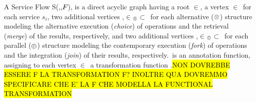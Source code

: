 \begin{definition} \label{def:service_flow}
  A Service Flow S(\V,\E,$F_{}$), is a direct acyclic graph having a root $\in$\V, a vertex $\in$\V\ for each service $s_i$,
  two additional vertices ,$\in$\V$_{\otimes}$$\subset$\V\ for each alternative ($\otimes$) structure modeling the alternative execution (\emph{choice}) of operations and the retrieval (\emph{merge}) of the results,
        respectively, and two additional vertices ,$\in$\V$_{\oplus}$$\subset$\V\ for each parallel ($\oplus$) structure modeling the contemporary execution (\emph{fork}) of operations and the integration (\emph{join}) of their results, respectively. \TP\,is an annotation function, assigning to each vertex $\in$\V\ a transformation function \TP.\hl{NON DOVREBBE ESSERE F LA TRANSFORMATION F? INOLTRE QUA DOVREMMO SPECIFICARE CHE E' LA F CHE MODELLA LA FUNCTIONAL TRANSFORMATION}
\end{definition}



%

